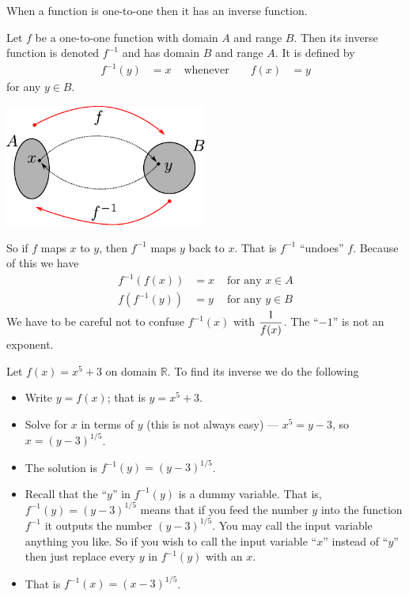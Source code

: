 When a function is one-to-one then it has an inverse function.
\begin{defn}\label{def inv func}
 Let $f$ be a one-to-one function with domain $A$ and range $B$. Then its inverse
function is denoted $f^{-1}$ and has domain $B$ and range $A$. It is defined by
\begin{align*}
  f^{-1}(y) &= x & \text{ whenever }&& f(x)&=y
\end{align*}
for any $y \in B$.
\begin{efig}
\begin{center}
 \includegraphics[height=4cm]{inv2}
\end{center}
\end{efig}
\end{defn}
So if $f$ maps $x$ to $y$, then $f^{-1}$ maps $y$ back to $x$. That is $f^{-1}$ ``undoes''
$f$. Because of this we have
\begin{align*}
  f^{-1}( f(x) ) &= x  &\mbox{ for any $x \in A$}\\
   f( f^{-1}(y) )&=y &\mbox{ for any $y \in B$}
\end{align*}
We have to be careful not to confuse $f^{-1}(x)$ with $\displaystyle \frac{1}{f(x)}$. The ``$-1$''
is not an exponent.

\begin{eg}
Let $f(x)=x^5+3$ on domain $\mathbb{R}$. To find its inverse we do the following
\begin{itemize}
 \item Write $y=f(x)$; that is $y=x^5+3$.
 \item Solve for $x$ in terms of $y$ (this is not always easy) --- $x^5=y-3$, so
$x=(y-3)^{1/5}$.
\item The solution is $f^{-1}(y) = (y-3)^{1/5}$.
\item Recall that the ``$y$'' in $f^{-1}(y)$ is a dummy variable. That is,
$f^{-1}(y) = (y-3)^{1/5}$ means that if you feed the number $y$ into the function
$f^{-1}$ it outputs the number $(y-3)^{1/5}$. You may call the input variable anything
you like. So if you wish to call the input variable ``$x$'' instead of ``$y$'' then just
replace every $y$ in $f^{-1}(y)$ with an $x$.
\item That is $f^{-1}(x) = (x-3)^{1/5}$.
\end{itemize}
\end{eg}


